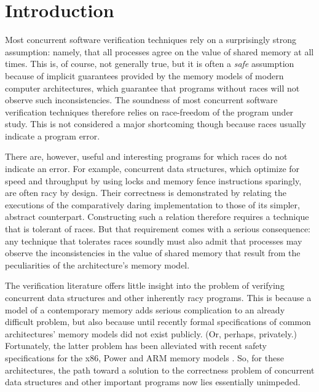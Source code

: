 \documentclass[11pt]{report}
\begin{document}

\chapter{Introduction}

Most concurrent software verification techniques rely on a
surprisingly strong assumption: namely, that all processes agree on
the value of shared memory at all times. This is, of course, not
generally true, but it is often a \emph{safe} assumption because of
implicit guarantees provided by the memory models of modern computer
architectures, which guarantee that programs without races will not
observe such inconsistencies. The soundness of most concurrent
software verification techniques therefore relies on race-freedom of
the program under study. This is not considered a major shortcoming
though because races usually indicate a program error.

There are, however, useful and interesting programs for which races do not indicate an error. For example, concurrent data structures, which optimize for speed and throughput by using locks and memory fence instructions sparingly, are often racy by design. Their correctness is demonstrated by relating the executions of the comparatively daring implementation to those of its simpler, abstract counterpart. Constructing such a relation therefore requires a technique that is tolerant of races. But that requirement comes with a serious consequence: any technique that tolerates races soundly must also admit that processes may observe the inconsistencies in the value of shared memory that result from the peculiarities of the architecture's memory model.

The verification literature offers little insight into the problem of verifying concurrent data structures and other inherently racy programs. This is because a model of a contemporary memory adds serious complication to an already difficult problem, but also because until recently formal specifications of common architectures' memory models did not exist publicly. (Or, perhaps, privately.) Fortunately, the latter problem has been alleviated with recent safety specifications for the x86, Power and ARM memory models \cite{DBLP:conf/tphol/OwensSS09,DBLP:conf/popl/2009damp}. So, for these architectures, the path toward a solution to the correctness problem of concurrent data structures and other important programs now lies essentially unimpeded.
\end{document}
